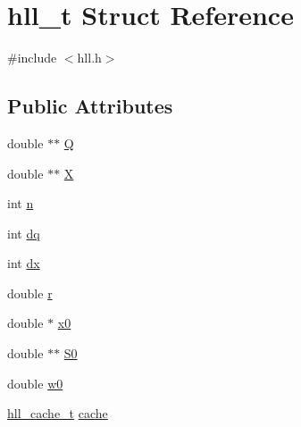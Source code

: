 \hypertarget{structhll__t}{
\section{hll\_\-t Struct Reference}
\label{structhll__t}
}


{\ttfamily \#include $<$hll.h$>$}

\subsection*{Public Attributes}
\begin{DoxyCompactItemize}
\item 
double $\ast$$\ast$ \hyperlink{structhll__t_a943151772582e3585ec2658fd3985220}{Q}
\item 
double $\ast$$\ast$ \hyperlink{structhll__t_a7bced271805f271554e0ce7e532303fd}{X}
\item 
int \hyperlink{structhll__t_af056cebead3545d72c6cbfd1998fe36c}{n}
\item 
int \hyperlink{structhll__t_a95b55bdf1e30483285b054d10800339a}{dq}
\item 
int \hyperlink{structhll__t_ad46b79e35272e8be8a221ae05f167ac7}{dx}
\item 
double \hyperlink{structhll__t_ac5c63b436a9f5afb3b7887297a053a8b}{r}
\item 
double $\ast$ \hyperlink{structhll__t_a1c0afe48b6612261538a0f170e7170a7}{x0}
\item 
double $\ast$$\ast$ \hyperlink{structhll__t_ab2ecb1d2e395a0b6ba98689ba1693a30}{S0}
\item 
double \hyperlink{structhll__t_ad2da9daf578727a5351db6fade835955}{w0}
\item 
\hyperlink{structhll__cache__t}{hll\_\-cache\_\-t} \hyperlink{structhll__t_a32ffadd7c65ddc2b45e0fa2c990d6f0d}{cache}
\end{DoxyCompactItemize}


